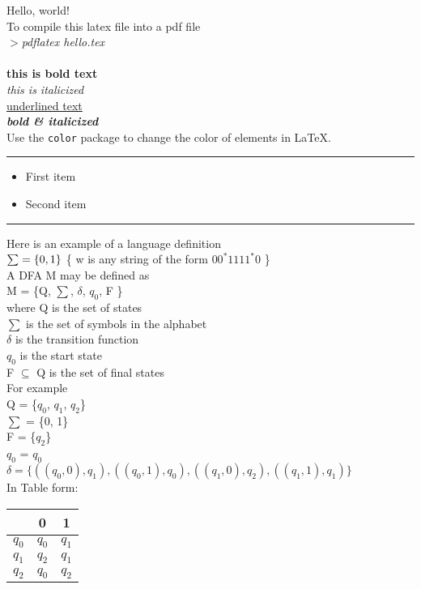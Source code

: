 \documentclass{article}
\begin{document}
Hello, world! \\

To compile this latex file into a pdf file\\

\textit{
$>$pdflatex hello.tex
}
\\
\\
\textbf{this is bold text} \\

\textit{this is italicized} \\
\underline{underlined text} \\
\textbf{\textit{bold \& italicized}} \\

Use the \texttt{color} package 
to change the color of elements in \LaTeX.
 
\noindent
{\color{blue} \rule{\linewidth}{0.1mm} }

\begin{itemize}
\color{blue}
\item First item
\item Second item
\end{itemize}
 
\noindent
{\color{red} \rule{\linewidth}{0.2mm} }

Here is an example of a language definition \\
$
\sum = \{0, 1 \}  \\
$
\{ w is any string of the form $00^*1111^*0$ \} \\

A DFA M may be defined as \\


M = \{Q, $\sum$, $\delta$, $q_0$, F \} \\
where Q is the set of states \\
$\sum$ is the set of symbols in the alphabet \\
$\delta$ is the transition function \\
$q_0$ is the start state \\
F $\subseteq$ Q is the set of final states \\


For example \\


Q = \{$q_0$, $q_1$, $q_2$\} \\
$\sum$ = \{0, 1\} \\
F = \{$q_2$\} \\
$q_0$ = $q_0$ \\
$\delta = \{((q_0, 0), q_1), ((q_0, 1), q_0), ((q_1, 0), q_2), ((q_1, 1), q_1)\}$ \\


In Table form: \\

\begin{center}
 \begin{tabular}{||c c c||} 
 \hline
 \space 	& 0 		& 1 		\\ [0.5ex] 
 \hline
 $q_0$ 		& $q_0$ 	& $q_1$		\\
 \hline
 $q_1$ 		& $q_2$ 	& $q_1$		\\
 \hline
 $q_2$ 		& $q_0$ 	& $q_2$		\\
 \hline
\end{tabular}
\end{center}
\end{document}
